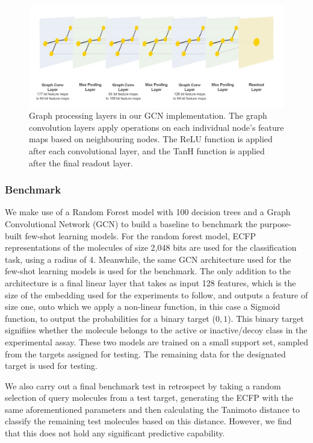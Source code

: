 \begin{figure}
	\centering
	\includegraphics[width=1\linewidth]{img/gcn-layers.png}
	\caption[Layers for graph processing in our GCN.]{Graph processing layers in our GCN implementation. The graph convolution layers apply operations on each individual node's feature maps based on neighbouring nodes. The ReLU function is applied after each convolutional layer, and the TanH function is applied after the final readout layer.}
	\label{fig:dvgcnarchi2}
\end{figure}

\subsubsection{Benchmark}

We make use of a Random Forest model with 100 decision trees and a Graph Convolutional Network (GCN) to build a baseline to benchmark the purpose-built few-shot learning models. For the random forest model, ECFP representations of the molecules of size 2,048 bits are used for the classification task, using a radius of 4. Meanwhile, the same GCN architecture used for the few-shot learning models is used for the benchmark. The only addition to the architecture is a final linear layer that takes as input 128 features, which is the size of the embedding used for the experiments to follow, and outputs a feature of size one, onto which we apply a non-linear function, in this case a Sigmoid function, to output the probabilities for a binary target (${0, 1}$). This binary target signifiies whether the molecule belongs to the active or inactive/decoy class in the experimental assay. These two models are trained on a small support set, sampled from the targets assigned for testing. The remaining data for the designated target is used for testing.

We also carry out a final benchmark test in retrospect by taking a random selection of query molecules from a test target, generating the ECFP with the same aforementioned parameters and then calculating the Tanimoto distance to classify the remaining test molecules based on this distance. However, we find that this does not hold any significant predictive capability. 

